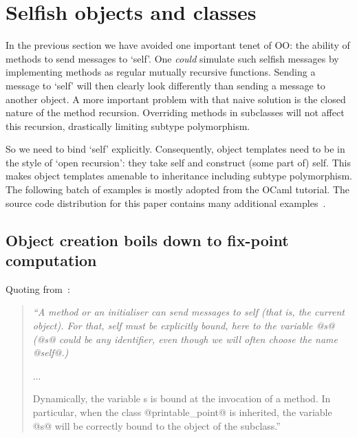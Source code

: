 





\section{Selfish objects and classes}
\label{S:self}

In the previous section we have avoided one important tenet of OO: the
ability of methods to send messages to `self'.  One \emph{could}
simulate such selfish messages by implementing methods as regular
mutually recursive functions. Sending a message to `self' will then
clearly look differently than sending a message to another object. A
more important problem with that naive solution is the closed nature
of the method recursion. Overriding methods in subclasses will not
affect this recursion, drastically limiting subtype polymorphism.

So we need to bind `self' explicitly. Consequently, object templates
need to be in the style of `open recursion': they take self and
construct (some part of) self. This makes object templates amenable to
inheritance including subtype polymorphism. The following batch of
examples is mostly adopted from the OCaml tutorial. The source code
distribution for this paper contains many additional
examples~\cite{OOHaskell}.






\subsection{Object creation boils down to fix-point computation}

Quoting from~\cite[\S\,3.2]{OCaml}:

\begin{quote}\itshape
``A method or an initialiser can send messages to self (that is, the
current object). For that, self must be explicitly bound, here to the
variable @s@ (@s@ could be any identifier, even though we will often
choose the name @self@.)

...

\noindent
Dynamically, the variable s is bound at the invocation of a method. In
particular, when the class @printable_point@ is inherited, the
variable @s@ will be correctly bound to the object of the subclass.''
\end{quote}


